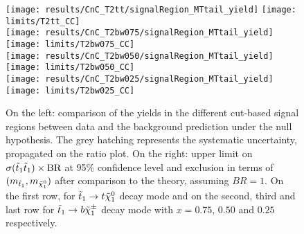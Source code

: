     \begin{figure}[h!]
        \centering
        \texttt{[image: results/CnC\_T2tt/signalRegion\_MTtail\_yield]}
        \texttt{[image: limits/T2tt\_CC]}\\
        \texttt{[image: results/CnC\_T2bw075/signalRegion\_MTtail\_yield]}
        \texttt{[image: limits/T2bw075\_CC]}\\
        \texttt{[image: results/CnC\_T2bw050/signalRegion\_MTtail\_yield]}
        \texttt{[image: limits/T2bw050\_CC]}\\
        \texttt{[image: results/CnC\_T2bw025/signalRegion\_MTtail\_yield]}
        \texttt{[image: limits/T2bw025\_CC]}\\
        \caption{On the left: comparison of the yields in the different cut-based signal
        regions between data and the background prediction under the null hypothesis. The
        grey hatching represents the systematic uncertainty, propagated on the ratio plot.
        On the right: upper limit on $\sigma(\tilde{t}_1\tilde{t}_1) \times \text{BR}$ at 95\% confidence level and exclusion in terms of
        $(m_{\tilde{t}_1},m_{\tilde{\chi}_1^0})$ after comparison to the theory, assuming
        $BR = 1$. On the first row, for $\tilde{t}_1 \rightarrow t \tilde{\chi}_1^0$ decay mode and on
        the second, third and last row for $\tilde{t}_1 \rightarrow b \tilde{\chi}_1^\pm$ decay mode
        with $x=0.75$, $0.50$ and $0.25$ respectively. }
        \label{fig:resultsCnC}
    \end{figure}

